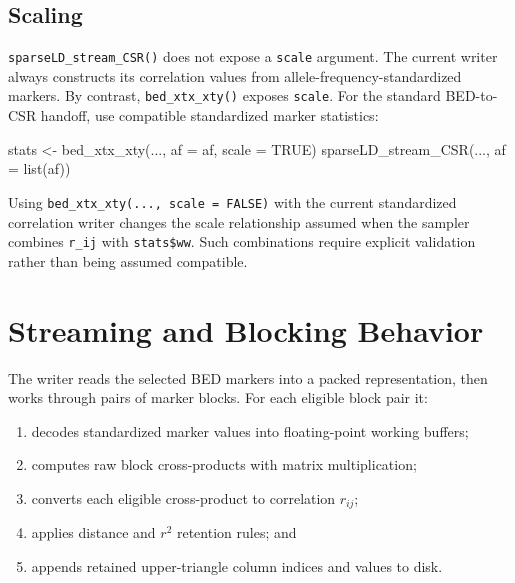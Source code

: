 \documentclass[
  11pt,
  letterpaper,
  DIV=11,
  numbers=noendperiod]{scrartcl}
\newenvironment{Shaded}{\begin{snugshade}}{\end{snugshade}}
\newcommand{\AttributeTok}[1]{\textcolor[rgb]{0.00,0.34,0.68}{#1}}
\newcommand{\ConstantTok}[1]{\textcolor[rgb]{0.67,0.33,0.00}{#1}}
\newcommand{\FunctionTok}[1]{\textcolor[rgb]{0.39,0.29,0.61}{#1}}
\newcommand{\NormalTok}[1]{\textcolor[rgb]{0.12,0.11,0.11}{#1}}
\newcommand{\OtherTok}[1]{\textcolor[rgb]{0.00,0.43,0.16}{#1}}
\providecommand{\tightlist}{%
  \setlength{\itemsep}{0pt}\setlength{\parskip}{0pt}}
\begin{document}
\subsection{Scaling}\label{scaling}

\texttt{sparseLD\_stream\_CSR()} does not expose a \texttt{scale}
argument. The current writer always constructs its correlation values
from allele-frequency-standardized markers. By contrast,
\texttt{bed\_xtx\_xty()} exposes \texttt{scale}. For the standard
BED-to-CSR handoff, use compatible standardized marker statistics:

\begin{Shaded}
\begin{Highlighting}[]
\NormalTok{stats }\OtherTok{\textless{}{-}} \FunctionTok{bed\_xtx\_xty}\NormalTok{(..., }\AttributeTok{af =}\NormalTok{ af, }\AttributeTok{scale =} \ConstantTok{TRUE}\NormalTok{)}
\FunctionTok{sparseLD\_stream\_CSR}\NormalTok{(..., }\AttributeTok{af =} \FunctionTok{list}\NormalTok{(af))}
\end{Highlighting}
\end{Shaded}

Using \texttt{bed\_xtx\_xty(...,\ scale\ =\ FALSE)} with the current
standardized correlation writer changes the scale relationship assumed
when the sampler combines \texttt{r\_ij} with \texttt{stats\$ww}. Such
combinations require explicit validation rather than being assumed
compatible.

\section{Streaming and Blocking
Behavior}\label{streaming-and-blocking-behavior}

The writer reads the selected BED markers into a packed representation,
then works through pairs of marker blocks. For each eligible block pair
it:

\begin{enumerate}
\def\labelenumi{\arabic{enumi}.}
\tightlist
\item
  decodes standardized marker values into floating-point working
  buffers;
\item
  computes raw block cross-products with matrix multiplication;
\item
  converts each eligible cross-product to correlation \(r_{ij}\);
\item
  applies distance and \(r^2\) retention rules; and
\item
  appends retained upper-triangle column indices and values to disk.
\end{enumerate}
\end{document}
